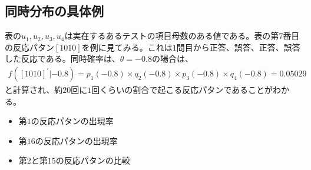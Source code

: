 \documentclass[12pt]{jarticle}
\begin{document}
\subsection{同時分布の具体例}
表の$u_1,u_2,u_3,u_4$は実在するあるテストの項目母数のある値である。表の第$7$番目の反応パタン$[1010]$を例に見てみる。これは$1$問目から正答、誤答、正答、誤答した反応である。同時確率は、$\theta = -0.8$の場合は、
\begin{eqnarray}
  \label{04}
  \displaystyle f([1010]^{\prime}|-0.8) = p_1(-0.8) \times q_2(-0.8) \times p_3(-0.8) \times q_4(-0.8) = 0.05029
\end{eqnarray}
と計算され、約$20$回に$1$回くらいの割合で起こる反応パタンであることがわかる。
\begin{itemize}
  \item 第$1$の反応パタンの出現率
  \item 第$16$の反応パタンの出現率
  \item 第$2$と第$15$の反応パタンの比較
\end{itemize}

\end{document}
